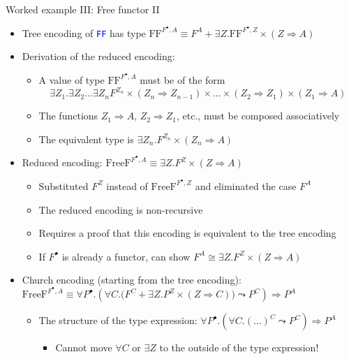 \documentclass[english,,russian]{beamer}
\begin{document}
\begin{frame}{Worked example III: Free functor II}
\begin{itemize}
\item Tree encoding of \texttt{\textcolor{blue}{\footnotesize{}FF}} has
type $\text{FF}^{F^{\bullet},A}\equiv F^{A}+\exists Z.\text{FF}^{F^{\bullet},Z}\times\left(Z\Rightarrow A\right)$
\item Derivation of the reduced encoding:
\begin{itemize}
\item A value of type $\text{FF}^{F^{\bullet},A}$ must be of the form {\footnotesize{}
\[
\exists Z_{1}.\exists Z_{2}...\exists Z_{n}F^{Z_{n}}\times\left(Z_{n}\Rightarrow Z_{n-1}\right)\times...\times\left(Z_{2}\Rightarrow Z_{1}\right)\times\left(Z_{1}\Rightarrow A\right)
\]
}{\footnotesize\par}
\item The functions $Z_{1}\Rightarrow A$, $Z_{2}\Rightarrow Z_{1}$, etc.,
must be composed associatively
\item The equivalent type is $\exists Z_{n}.F^{Z_{n}}\times\left(Z_{n}\Rightarrow A\right)$
\end{itemize}
\item Reduced encoding: $\text{FreeF}^{F^{\bullet},A}\equiv\exists Z.F^{Z}\times\left(Z\Rightarrow A\right)$
\begin{itemize}
\item Substituted $F^{Z}$ instead of $\text{FreeF}^{F^{\bullet},Z}$ and
eliminated the case $F^{A}$
\item The reduced encoding is non-recursive
\item Requires a proof that this encoding is equivalent to the tree encoding
\item If $F^{\bullet}$ is already a functor, can show $F^{A}\cong\exists Z.F^{Z}\times\left(Z\Rightarrow A\right)$
\end{itemize}
\item Church encoding (starting from the tree encoding): $\text{FreeF}^{F^{\bullet},A}\equiv\forall P^{\bullet}.\left(\forall C.\big(F^{C}+\exists Z.P^{Z}\times\left(Z\Rightarrow C\right)\big)\leadsto P^{C}\right)\Rightarrow P^{A}$
\begin{itemize}
\item The structure of the type expression: $\forall P^{\bullet}.\left(\forall C.(...)^{C}\leadsto P^{C}\right)\Rightarrow P^{A}$
\begin{itemize}
\item Cannot move $\forall C$ or $\exists Z$ to the outside of the type
expression!
\end{itemize}
\end{itemize}
\end{itemize}
\end{frame}
\end{document}
